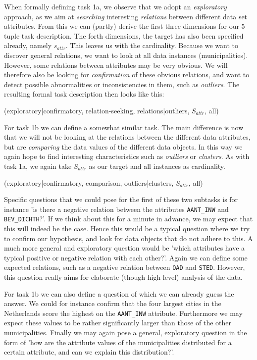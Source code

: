 When formally defining task 1a, we observe that we adopt an \textit{exploratory} approach, as we aim at \textit{searching} interesting \textit{relations} between different data set attributes. From this we can (partly) derive the first three dimensions for our 5-tuple task description. The forth dimensions, the target has also been specified already, namely $s_{attr}$. This leaves us with the cardinality. Because we want to discover general relations, we want to look at all data instances (municipalities). However, some relations between attributes may be very obvious. We will therefore also be looking for \textit{confirmation} of these obvious relations, and want to detect possible abnormalities or inconsistencies in them, such as \textit{outliers}. The resulting formal task description then looks like this:

(exploratory|confirmatory, relation-seeking, relations|outliers, $S_{attr}$, all)

For task 1b we can define a somewhat similar task. The main difference is now that we will not be looking at the relations between the different data attributes, but are \textit{comparing} the data values of the different data objects. In this way we again hope to find interesting characteristics such as \textit{outliers} or \textit{clusters}. As with task 1a, we again take $S_{attr}$ as our target and all instances as cardinality.

(exploratory|confirmatory, comparison, outliers|clusters, $S_{attr}$, all)

Specific questions that we could pose for the first of these two subtasks is for instance 'is there a negative relation between the attributes \texttt{AANT\_INW} and \texttt{BEV\_DICHTH}?'. If we think about this for a minute in advance, we may expect that this will indeed be the case. Hence this would be a typical question where we try to confirm our hypothesis, and look for data objects that do not adhere to this. A much more general and exploratory question would be 'which attributes have a typical positive or negative relation with each other?'. Again we can define some expected relations, such as a negative relation between \texttt{OAD} and \texttt{STED}. However, this question really aims for elaborate (though high level) analysis of the data.

For task 1b we can also define a question of which we can already guess the answer. We could for instance confirm that the four largest cities in the Netherlands score the highest on the \texttt{AANT\_INW} attribute. Furthermore we may expect these values to be rather significantly larger than those of the other municipalities. Finally we may again pose a general, exploratory question in the form of 'how are the attribute values of the municipalities distributed for a certain attribute, and can we explain this distribution?'.




